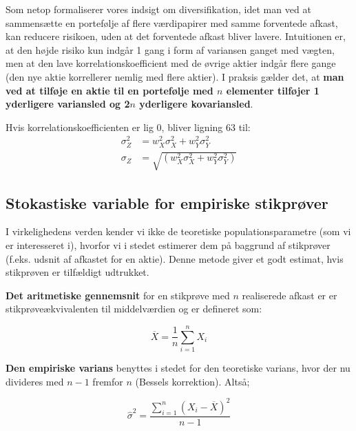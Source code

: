 \documentclass[10pt,reqno, usenames]{article}
\begin{document}
Som netop formaliserer vores indsigt om diversifikation, idet man ved at sammensætte en portefølje af flere værdipapirer med samme forventede
afkast, kan reducere risikoen, uden at det forventede afkast bliver lavere. Intuitionen er, at den højde risiko kun indgår 1 gang i form af variansen ganget med vægten, men at den lave korrelationskoefficient med de øvrige aktier indgår flere gange (den nye aktie korrellerer nemlig med flere aktier). I praksis gælder det, at \textbf{man ved at tilføje en aktie til en portefølje med $n$ elementer tilføjer 1 yderligere variansled og 2$n$ yderligere kovariansled}.

\vspace{10 pt}

Hvis korrelationskoefficienten er lig 0, bliver ligning 63 til: 
\begin{align*}
    \sigma_Z^2 &= w_X^2 \sigma_X^2 + w_Y^2\sigma_Y^2  \\
    \sigma_Z &= \sqrt{(w_X^2 \sigma_X^2 + w_Y^2\sigma_Y^2 )}
\end{align*}

\subsection{Stokastiske variable for empiriske stikprøver}
I virkelighedens verden kender vi ikke de teoretiske
populationsparametre (som vi er interesseret i), hvorfor vi i stedet estimerer dem på baggrund af stikprøver (f.eks. udsnit af afkastet for en aktie). Denne metode giver et godt estimat, hvis stikprøven er tilfældigt udtrukket. 

\vspace{10 pt}

\textbf{Det aritmetiske gennemsnit} for en stikprøve med $n$ realiserede afkast er er stikprøveækvivalenten til middelværdien og er defineret som: 

\begin{equation}
    \overline{X} = \frac{1}{n} \sum_{i=1}^{n} X_i
\end{equation}

\vspace{10 pt}

\textbf{Den empiriske varians} benyttes i stedet for den teoretiske varians, hvor der nu divideres med $n-1$ fremfor $n$ (Bessels korrektion). Altså;

\begin{equation}
    \hat{\sigma}^2 = \frac{\sum_{i=1}^{n} (X_i - \overline{X})^2}{n - 1}
\end{equation}
\end{document}
